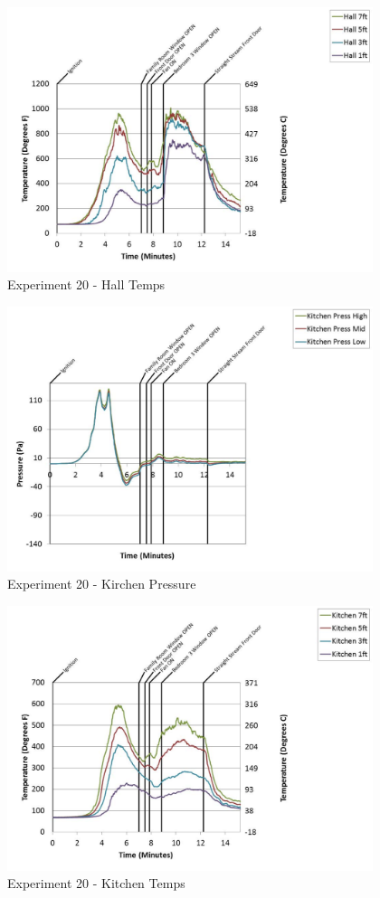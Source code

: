 \documentclass{article}
\begin{document}
\begin{appendices}
	\clearpage

	\begin{figure}[h!]
		\centering
		\includegraphics[height=3.05in]{0_Images/Results_Charts/Exp_20_Charts/HallTemps.pdf}
		\caption{Experiment 20 - Hall Temps}
	\end{figure}
 

	\begin{figure}[h!]
		\centering
		\includegraphics[height=3.05in]{0_Images/Results_Charts/Exp_20_Charts/KirchenPressure.pdf}
		\caption{Experiment 20 - Kirchen Pressure}
	\end{figure}
 
	\clearpage

	\begin{figure}[h!]
		\centering
		\includegraphics[height=3.05in]{0_Images/Results_Charts/Exp_20_Charts/KitchenTemps.pdf}
		\caption{Experiment 20 - Kitchen Temps}
	\end{figure}
 


\end{appendices}
\end{document}
